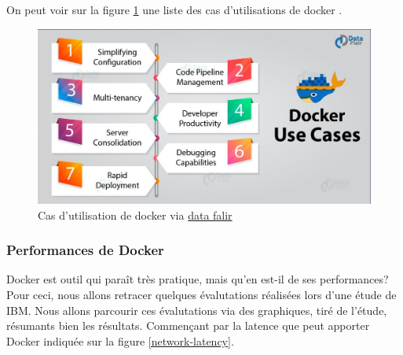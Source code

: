 \documentclass[
    iai, %
    il, %
]{heig-tb}
\begin{document}
On peut voir sur la figure \ref{docker-use-cases} une liste des cas d'utilisations de docker \cite{data-flair-use-cases}.

\begin{center}
    \begin{figure}
        \includegraphics[width=\textwidth]{./assets/figures/docker-use-cases.jpg}
        \caption[Cas d'utilisation de docker]{Cas d'utilisation de docker via \href{https://data-flair.training/blogs/wp-content/uploads/sites/2/2018/10/}{data falir}
            \label{docker-use-cases}}
    \end{figure}
\end{center}




\subsubsection{Performances de Docker}
Docker est outil qui paraît très pratique, mais qu'en est-il de ses performances?
Pour ceci, nous allons retracer quelques évalutations réalisées lors d'une étude de IBM. Nous allons parcourir ces évalutations via des graphiques, tiré de l'étude, résumants bien les résultats.
Commençant par la latence que peut apporter Docker indiquée sur la figure \ref{network-latency}.
\end{document}
